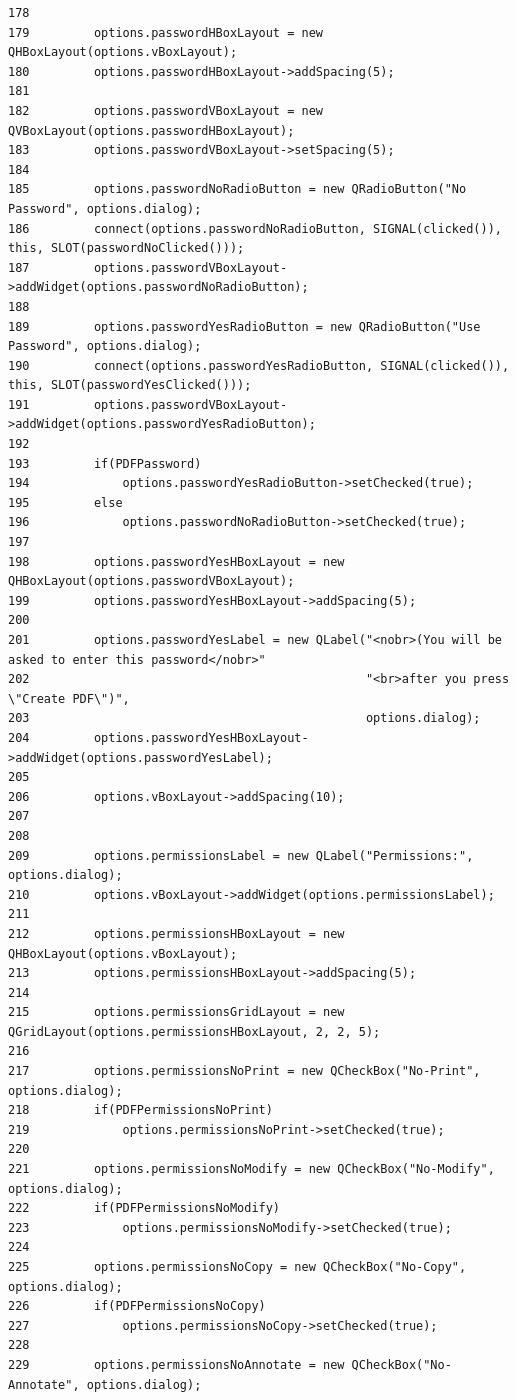 \begin{verbatim}
178 
179         options.passwordHBoxLayout = new QHBoxLayout(options.vBoxLayout);
180         options.passwordHBoxLayout->addSpacing(5);
181 
182         options.passwordVBoxLayout = new QVBoxLayout(options.passwordHBoxLayout);
183         options.passwordVBoxLayout->setSpacing(5);
184 
185         options.passwordNoRadioButton = new QRadioButton("No Password", options.dialog);
186         connect(options.passwordNoRadioButton, SIGNAL(clicked()), this, SLOT(passwordNoClicked()));
187         options.passwordVBoxLayout->addWidget(options.passwordNoRadioButton);
188 
189         options.passwordYesRadioButton = new QRadioButton("Use Password", options.dialog);
190         connect(options.passwordYesRadioButton, SIGNAL(clicked()), this, SLOT(passwordYesClicked()));
191         options.passwordVBoxLayout->addWidget(options.passwordYesRadioButton);
192 
193         if(PDFPassword)
194             options.passwordYesRadioButton->setChecked(true);
195         else
196             options.passwordNoRadioButton->setChecked(true);
197 
198         options.passwordYesHBoxLayout = new QHBoxLayout(options.passwordVBoxLayout);
199         options.passwordYesHBoxLayout->addSpacing(5);
200 
201         options.passwordYesLabel = new QLabel("<nobr>(You will be asked to enter this password</nobr>"
202                                               "<br>after you press \"Create PDF\")",
203                                               options.dialog);
204         options.passwordYesHBoxLayout->addWidget(options.passwordYesLabel);
205 
206         options.vBoxLayout->addSpacing(10);
207 
208 
209         options.permissionsLabel = new QLabel("Permissions:", options.dialog);
210         options.vBoxLayout->addWidget(options.permissionsLabel);
211 
212         options.permissionsHBoxLayout = new QHBoxLayout(options.vBoxLayout);
213         options.permissionsHBoxLayout->addSpacing(5);
214 
215         options.permissionsGridLayout = new QGridLayout(options.permissionsHBoxLayout, 2, 2, 5);
216 
217         options.permissionsNoPrint = new QCheckBox("No-Print", options.dialog);
218         if(PDFPermissionsNoPrint)
219             options.permissionsNoPrint->setChecked(true);
220 
221         options.permissionsNoModify = new QCheckBox("No-Modify", options.dialog);
222         if(PDFPermissionsNoModify)
223             options.permissionsNoModify->setChecked(true);
224 
225         options.permissionsNoCopy = new QCheckBox("No-Copy", options.dialog);
226         if(PDFPermissionsNoCopy)
227             options.permissionsNoCopy->setChecked(true);
228 
229         options.permissionsNoAnnotate = new QCheckBox("No-Annotate", options.dialog);

\end{verbatim}

